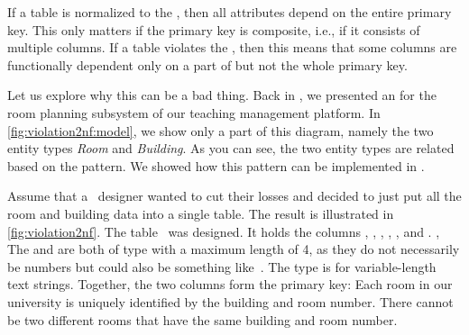 %
%
%
%
%
%
%
If a table is normalized to the , then all attributes depend on the entire primary key.
This only matters if the primary key is composite, i.e., if it consists of multiple columns.
If a table violates the , then this means that some columns are functionally dependent only on a part of but not the whole primary key.

Let us explore why this can be a bad thing.
Back in , we presented an  for the room planning subsystem of our teaching management platform.
In \cref{fig:violation2nf:model}, we show only a part of this diagram, namely the two entity types \emph{Room} and \emph{Building}.
As you can see, the two entity types are related based on the  pattern.
We showed how this pattern can be implemented in .

Assume that a \db\ designer wanted to cut their losses and decided to just put all the room and building data into a single table.
The result is illustrated in \cref{fig:violation2nf}.
The table~ was designed.
It holds the columns , , , , , and .
, 
The  and  are both of type  with a maximum length of 4, as they do not necessarily be numbers but could also be something like~.
The type  is for variable-length text strings.
Together, the two columns form the primary key:
Each room in our university is uniquely identified by the building and room number.
There cannot be two different rooms that have the same building and room number.


